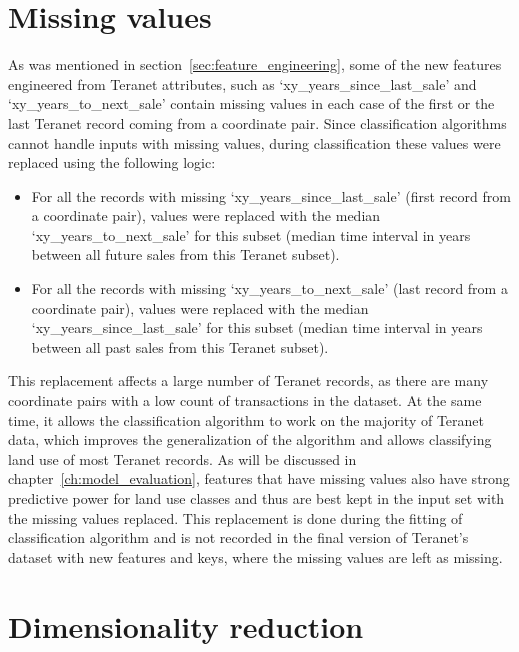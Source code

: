 \section{Missing values} \label{sec:missing_values}

As was mentioned in section~\ref{sec:feature_engineering}, some of the new features engineered from Teranet attributes, such as `xy\_years\_since\_last\_sale' and `xy\_years\_to\_next\_sale' contain missing values in each case of the first or the last Teranet record coming from a coordinate pair.
Since classification algorithms cannot handle inputs with missing values, during classification these values were replaced using the following logic:

\begin{itemize}
    \item For all the records with missing `xy\_years\_since\_last\_sale' (first record from a coordinate pair), values were replaced with the median `xy\_years\_to\_next\_sale' for this subset (median time interval in years between all future sales from this Teranet subset).
    \item For all the records with missing `xy\_years\_to\_next\_sale' (last record from a coordinate pair), values were replaced with the median `xy\_years\_since\_last\_sale' for this subset (median time interval in years between all past sales from this Teranet subset).
\end{itemize}

This replacement affects a large number of Teranet records, as there are many coordinate pairs with a low count of transactions in the dataset.
At the same time, it allows the classification algorithm to work on the majority of Teranet data, which improves the generalization of the algorithm and allows classifying land use of most Teranet records.
As will be discussed in chapter~\ref{ch:model_evaluation}, features that have missing values also have strong predictive power for land use classes and thus are best kept in the input set with the missing values replaced.
This replacement is done during the fitting of classification algorithm and is not recorded in the final version of Teranet's dataset with new features and keys, where the missing values are left as missing.

\section{Dimensionality reduction} \label{sec:dimensionality_reduction}

